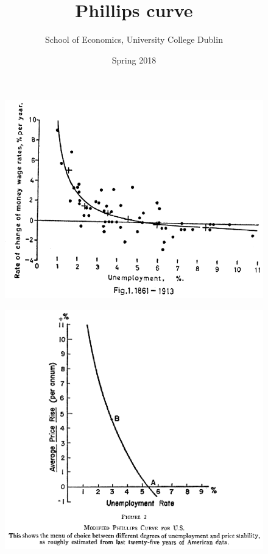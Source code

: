 \documentclass{beamer}
\title{Phillips curve}
\author{School of Economics, University College Dublin}
\date{Spring 2018}
\begin{document}
\begin{frame}
 \titlepage
\end{frame}

\begin{frame}
  \begin{figure}
    \includegraphics[scale=.8]{pc.eps}
  \end{figure}
\end{frame}

\begin{frame}
  \begin{figure}
    \includegraphics[scale=.8]{pc2.eps}
  \end{figure}
\end{frame}
\end{document}
